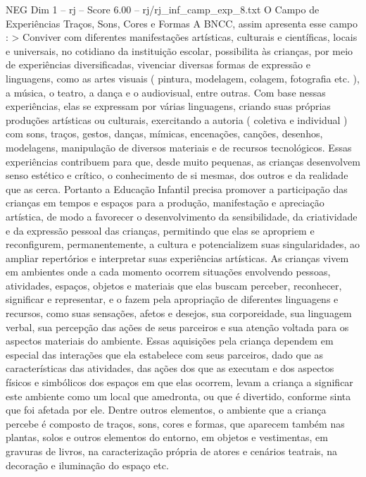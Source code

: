 \begin{textsample}{NEG Dim 1 – rj – Score 6.00 – rj/rj\_inf\_camp\_exp\_8.txt}  \label{ex:f1_neg_017}
O Campo de Experiências Traços, Sons, Cores e Formas A BNCC, assim apresenta esse campo : > Conviver com diferentes manifestações artísticas, culturais e científicas, locais e universais, no cotidiano da instituição escolar, possibilita às crianças, por meio de experiências diversificadas, vivenciar diversas formas de expressão e linguagens, como as artes visuais ( pintura, modelagem, colagem, fotografia etc. ), a música, o teatro, a dança e o audiovisual, entre outras.
Com base nessas experiências, elas se expressam por várias linguagens, criando suas próprias produções artísticas ou culturais, exercitando a autoria ( coletiva e individual ) com sons, traços, gestos, danças, mímicas, encenações, canções, desenhos, modelagens, manipulação de diversos materiais e de recursos tecnológicos.
Essas experiências contribuem para que, desde muito pequenas, as crianças desenvolvem senso estético e crítico, o conhecimento de si mesmas, dos outros e da realidade que as cerca.
Portanto a Educação Infantil precisa promover a participação das crianças em tempos e espaços para a produção, manifestação e apreciação artística, de modo a favorecer o desenvolvimento da sensibilidade, da criatividade e da expressão pessoal das crianças, permitindo que elas se apropriem e reconfigurem, permanentemente, a cultura e potencializem suas singularidades, ao ampliar repertórios e interpretar suas experiências artísticas.
As crianças vivem em ambientes onde a cada momento ocorrem situações envolvendo pessoas, atividades, espaços, objetos e materiais que elas buscam perceber, reconhecer, significar e representar, e o fazem pela apropriação de diferentes linguagens e recursos, como suas sensações, afetos e desejos, sua corporeidade, sua linguagem verbal, sua percepção das ações de seus parceiros e sua atenção voltada para os aspectos materiais do ambiente.
Essas aquisições pela criança dependem em especial das interações que ela estabelece com seus parceiros, dado que as características das atividades, das ações dos que as executam e dos aspectos físicos e simbólicos dos espaços em que elas ocorrem, levam a criança a significar este ambiente como um local que amedronta, ou que é divertido, conforme sinta que foi afetada por ele.
Dentre outros elementos, o ambiente que a criança percebe é composto de traços, sons, cores e formas, que aparecem também nas plantas, solos e outros elementos do entorno, em objetos e vestimentas, em gravuras de livros, na caracterização própria de atores e cenários teatrais, na decoração e iluminação do espaço etc.

\end{textsample}
